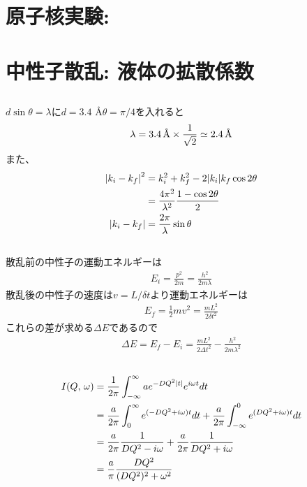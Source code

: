 \documentclass[../../master.tex]{subfiles}
\begin{document}
\clearpage
\section{原子核実験:}

\clearpage
\section{中性子散乱: 液体の拡散係数}
\subsection{}
\(d\sin\theta = \lambda\)に\(d=3.4\) \AA \(\theta = \pi/4\)を入れると
\begin{align}
    \lambda = 3.4 \text{\,\AA} \times \frac{1}{\sqrt{2}} \simeq 2.4 \text{\,\AA}
\end{align}
また、
\begin{align}
    \abs{k_i-k_f}^2 &= k_i^2+k_f^2-2\abs{k_i}{k_f}\cos2\theta\\
    &=\frac{4\pi^2}{\lambda^2}\frac{1-\cos2\theta}{2}\\
    \abs{k_i-k_f} &= \frac{2\pi}{\lambda}\sin\theta
\end{align}

\subsection{}
散乱前の中性子の運動エネルギーは
\begin{align}
    E_i = \frac{p^2}{2m} = \frac{h^2}{2m\lambda}
\end{align}
散乱後の中性子の速度は\(v=L/\delta t\)より運動エネルギーは
\begin{align}
    E_f = \frac{1}{2}mv^2 = \frac{mL^2}{2\delta t^2}
\end{align}
これらの差が求める\(\Delta E\)であるので
\begin{align}
    \Delta E = E_f - E_i = \frac{mL^2}{2\Delta t^2} - \frac{h^2}{2m\lambda^2}
\end{align}

\subsection{}
\begin{align}
    I(Q,\,\omega)
    &= \frac{1}{2\pi}\int_{-\infty}^{\infty} ae^{-DQ^2\abs{t}}e^{i\omega t}dt\\
    &= \frac{a}{2\pi}\int_{0}^{\infty}e^{(-DQ^2+i\omega)t}dt+\frac{a}{2\pi}\int_{-\infty}^{0} e^{(DQ^2+i\omega)t}dt\\
    &= \frac{a}{2\pi}\frac{1}{DQ^2-i\omega} +\frac{a}{2\pi}\frac{1}{DQ^2+i\omega}\\
    &=\frac{a}{\pi}\frac{DQ^2}{(DQ^2)^2+\omega^2}
\end{align}
\end{document}
